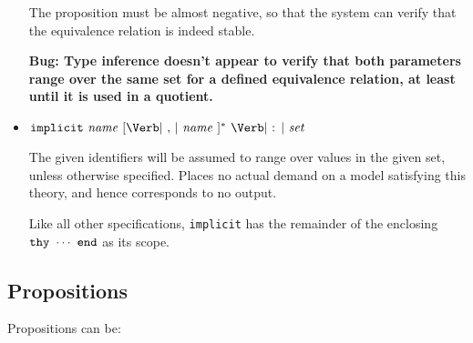 \documentclass[11pt]{article}
\newcommand{\keywd}[1]{\mbox{\texttt{#1}}\xspace}
\newcommand{\END}{\keywd{end}}
\newcommand{\IMPLICIT}{\keywd{implicit}}
\newcommand{\THY}{\keywd{thy}}
\newcommand{\metav}[1]{\mbox{\textit{#1}}\xspace}
\newcommand{\Ident}{\metav{name}}
\newcommand{\Identifier}{\Ident}
\newcommand{\Setexp}{\metav{set}}
\newcommand{\COLON}{\mbox{\Verb| : |}}
\newcommand{\COMMA}{\mbox{\Verb| , |}}
\begin{document}
\begin{itemize}
  The proposition must be almost negative, so that the system can 
  verify that the equivalence relation is indeed stable.

  \textbf{Bug:  Type inference doesn't appear to verify that both parameters 
  range over the same set for a defined equivalence relation, at least
  until it is used in a quotient.}
  
\item $\IMPLICIT\ \Identifier\ [\COMMA\ \Identifier\ ]^*\ \COLON\ \Setexp$
  
  The given identifiers will be assumed to range over values in the
  given set, unless otherwise specified.  Places no actual demand
  on a model satisfying this theory, and hence corresponds to
  no output.  
  
  Like all other specifications, \IMPLICIT has the remainder of the
  enclosing $\THY\ \cdots\ \END$ as its scope.
\end{itemize}

\subsection{Propositions}

Propositions can be:
\end{document}
